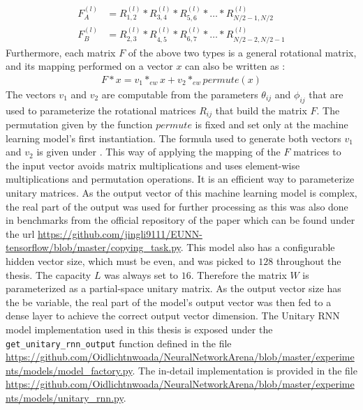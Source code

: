 \documentclass[draft,final]{vutinfth} %
\begin{document}
    \begin{align}
        F_A^{(l)} &= R_{1,2}^{(l)} * R_{3,4}^{(l)} * R_{5,6}^{(l)} * \ldots * R_{N/2-1,N/2}^{(l)} \\
        F_B^{(l)} &= R_{2,3}^{(l)} * R_{4,5}^{(l)} * R_{6,7}^{(l)} * \ldots * R_{N/2-2,N/2-1}^{(l)}
    \end{align}
    Furthermore, each matrix $F$ of the above two types is a general rotational matrix, and its mapping performed on a vector $x$ can also be written as \cite[p. 4]{EfficientUnitaryRNNs}:
    \begin{align}
        F*x = v_1 *_{ew} x + v_2 *_{ew} permute(x)
    \end{align}
    The vectors $v_1$ and $v_2$ are computable from the parameters $\theta_{ij}$ and $\phi_{ij}$ that are used to parameterize the rotational matrices $R_{ij}$ that build the matrix $F$.
    The permutation given by the function $permute$ is fixed and set only at the machine learning model's first instantiation.
    The formula used to generate both vectors $v_1$ and $v_2$ is given under \cite[p. 4]{EfficientUnitaryRNNs}.
    This way of applying the mapping of the $F$ matrices to the input vector avoids matrix multiplications and uses element-wise multiplications and permutation operations. It is an efficient way to parameterize unitary matrices.
    As the output vector of this machine learning model is complex, the real part of the output was used for further processing as this was also done in benchmarks from the official repository of the paper \cite{EfficientUnitaryRNNs} which can be found under the url \url{https://github.com/jingli9111/EUNN-tensorflow/blob/master/copying_task.py}.
    This model also has a configurable hidden vector size, which must be even, and was picked to $128$ throughout the thesis.
    The capacity $L$ was always set to $16$. Therefore the matrix $W$ is parameterized as a partial-space unitary matrix.
    As the output vector size has the be variable, the real part of the model's output vector was then fed to a dense layer to achieve the correct output vector dimension.
    The Unitary RNN model implementation used in this thesis is exposed under the \texttt{get\_unitary\_rnn\_output} function defined in the file \url{https://github.com/Oidlichtnwoada/NeuralNetworkArena/blob/master/experiments/models/model_factory.py}.
    The in-detail implementation is provided in the file \url{https://github.com/Oidlichtnwoada/NeuralNetworkArena/blob/master/experiments/models/unitary_rnn.py}.
\end{document}
